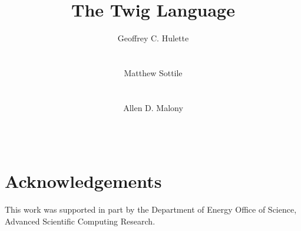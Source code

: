 \documentclass{acm_proc_article-sp}
\begin{document}
\title{The Twig Language}


\author{
\alignauthor
Geoffrey C. Hulette\\
\\
\\
\alignauthor
Matthew Sottile\\
\\
\\
\alignauthor
Allen D. Malony\\
\\
\\
}

\maketitle









\section{Acknowledgements}

This work was supported in part by the Department of Energy Office of Science,
Advanced Scientific Computing Research.



\end{document}

